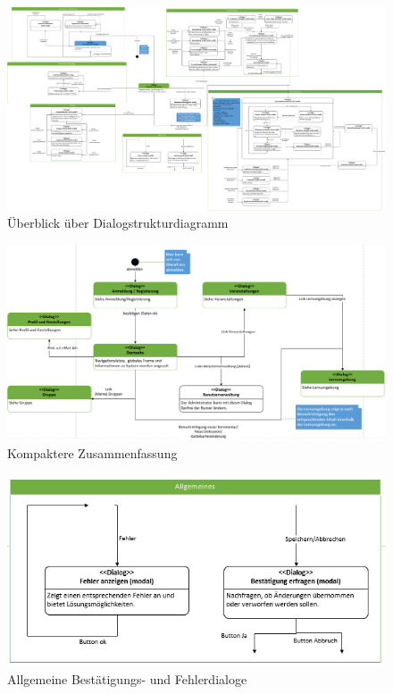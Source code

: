 \documentclass[12pt,a4paper]{article}
\begin{document}
{\begin{landscape}
\begin{figure}[H]
	\centering
	\includegraphics[width=18cm]{Bilder/Mockups/DSDGesamt.png}
	\caption{Überblick über Dialogstrukturdiagramm}
	\label{Dialogstrukturdiagramm}
\end{figure}

\begin{figure}[H]
	\centering
	\includegraphics[width=25cm]{Bilder/Mockups/DSDGesamtuebersicht.png}
	\caption{Kompaktere Zusammenfassung}
	\label{DialogstrukturdiagrammZusammenfassung}
\end{figure}

\begin{figure}[H]
	\centering
	\includegraphics[width=25cm]{Bilder/Mockups/DSDAllgemeines.png}
	\caption{Allgemeine Bestätigungs- und Fehlerdialoge}
	\label{DSDAllgemeines}
\end{figure}


\end{landscape}}
\end{document}
